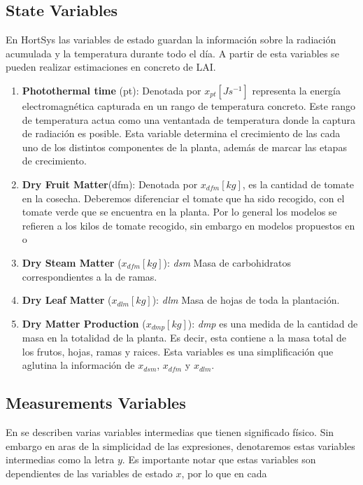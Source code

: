     \subsection{State Variables} 
    En HortSys las variables de estado guardan la información sobre la radiación acumulada y la temperatura durante todo el día. A partir de esta variables se pueden realizar estimaciones en concreto de LAI. 
        
    \begin{enumerate}

        \item \textbf{Photothermal time} (pt): Denotada por $x_{pt}[Js^{-1}]$ representa la energía electromagnética capturada en un rango de temperatura concreto. Este rango de temperatura actua como una ventantada de temperatura donde la captura de radiación es posible. Esta variable determina el crecimiento de las cada uno de los distintos componentes de la planta, además de marcar las etapas de crecimiento.

        
        \item \textbf{Dry Fruit Matter}(dfm): Denotada por $x_{dfm}[kg]$, es la  cantidad de tomate en la cosecha. Deberemos diferenciar el tomate que ha sido recogido, con el tomate verde que se encuentra en la planta. Por lo general los modelos se refieren a los kilos de tomate recogido, sin embargo en modelos propuestos en \cite{VanthoorThesis} o 
 
        \item \textbf{Dry Steam Matter} ($x_{dfm}[kg]$): \emph{dsm} Masa de carbohidratos correspondientes a la de ramas.
        
        \item \textbf{Dry Leaf Matter} ($x_{dlm}[kg]$): \emph{dlm} Masa de hojas de toda la plantación.
    
        \item \textbf{Dry Matter Production} ($x_{dmp}[kg]$): \emph{dmp} es una medida de la cantidad de masa en la totalidad de la planta. Es decir, esta contiene a la masa total de los frutos, hojas, ramas y raices. Esta variables es una simplificación que aglutina la información de $x_{dsm}$, $x_{dfm}$ y $x_{dlm}$.
     
    \end{enumerate}

    
    \subsection{Measurements Variables}
    En \cite{Martinez-Ruiz2019} se describen varias variables intermedias que tienen significado físico. Sin embargo en aras de la simplicidad de las expresiones, denotaremos estas variables intermedias como la letra $y$. Es importante notar que estas variables son dependientes de las variables de estado $x$, por lo que en cada 

